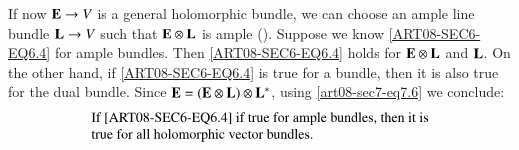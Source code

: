 If now $\mathbf{E}\to V$ is a general holomorphic bundle, we can choose an ample line bundle $\mathbf{L}\to V$ such that $\mathbf{E}\otimes \mathbf{L}$ is ample (\cite{art08-key11}). Suppose we know \eqref{ART08-SEC6-EQ6.4} for ample bundles. Then \eqref{ART08-SEC6-EQ6.4} holds for $\mathbf{E}\otimes\mathbf{L}$ and $\mathbf{L}$. On the other hand, if \eqref{ART08-SEC6-EQ6.4} is true for a bundle, then it is also true for the dual bundle. Since $\mathbf{E}=(\mathbf{E}\otimes \mathbf{L})\otimes \mathbf{L}^{*}$, using \eqref{art08-sec7-eq7.6} we conclude:
\begin{equation}
\begin{array}{l}
\text{If \eqref{ART08-SEC6-EQ6.4} if true for ample bundles, then it is}\\
\text{true for all holomorphic vector bundles.}
\end{array}\label{art08-sec7-eq7.14}
\end{equation}

